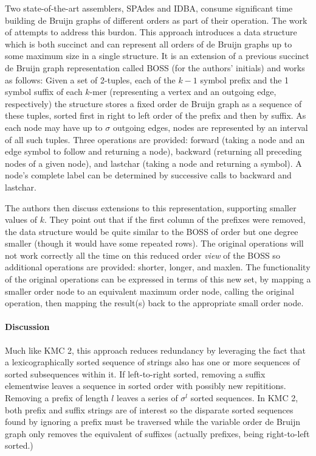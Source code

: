 Two state-of-the-art assemblers, SPAdes and IDBA, consume significant time building de Bruijn graphs of different orders as part of their operation.
The work of \cite{boucher2014variable} attempts to address this burdon.
This approach introduces a data structure which is both succinct and can represent all orders of de Bruijn graphs up to some maximum size in a single structure.
It is an extension of a previous succinct de Bruijn graph representation called BOSS (for the authors' initials) and works as follows: Given a set of 2-tuples, each of the $k-1$ symbol prefix and the 1 symbol suffix of each $k$-mer (representing a vertex and an outgoing edge, respectively) the structure stores a fixed order de Bruijn graph as a sequence of these tuples, sorted first in right to left order of the prefix and then by suffix.
As each node may have up to $\sigma$ outgoing edges, nodes are represented by an interval of all such tuples.
Three operations are provided: forward (taking a node and an edge symbol to follow and returning a node), backward (returning all preceding nodes of a given node), and lastchar (taking a node and returning a symbol).
A node's complete label can be determined by successive calls to backward and lastchar.  

The authors then discuss extensions to this representation, supporting smaller values of $k$.
They point out that if the first column of the prefixes were removed, the data structure would be quite similar to the BOSS of order but one degree smaller (though it would have some repeated rows).
The original operations will not work correctly all the time on this reduced order \emph{view} of the BOSS so additional operations are provided: shorter, longer, and maxlen.
The functionality of the original operations can be expressed in terms of this new set, by mapping a smaller order node to an equivalent maximum order node, calling the original operation, then mapping the result(s) back to the appropriate small order node.

\paragraph{Discussion}

Much like KMC 2, this approach reduces redundancy by leveraging the fact that a lexicographically sorted sequence of strings also has one or more sequences of sorted subsequences within it.  If left-to-right sorted, removing a suffix elementwise leaves a sequence in sorted order with possibly new repititions.  Removing a prefix of length $l$ leaves a series of $\sigma^l$ sorted sequences.  In KMC 2, both prefix and suffix strings are of interest so the disparate sorted sequences found by ignoring a prefix must be traversed while the variable order de Bruijn graph only removes the equivalent of suffixes (actually prefixes, being right-to-left sorted.)




